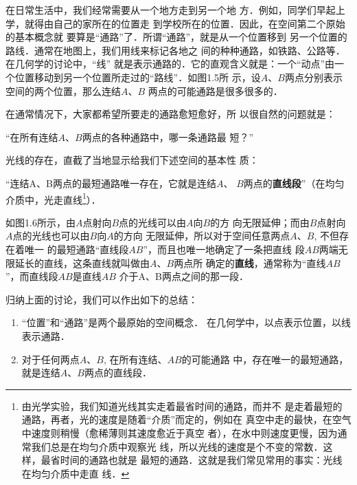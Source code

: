 在日常生活中，我们经常需要从一个地方走到另一个地
方．例如，同学们早起上学，就得由自己的家所在的位置走
到学校所在的位置．因此，在空间第二个原始的基本概念就
要算是“通路”了．所谓“通路”，就是从一个位置移到
另一个位置的路线．通常在地图上，我们用线来标记各地之
间的种种通路，如铁路、公路等．在几何学的讨论中，“线”
就是表示通路的．它的直观含义就是：一个“动点”由一
个位置移动到另一个位置所走过的“路线”．如图1.5所
示，设$A$、$B$两点分别表示空间的两个位置，那么连结$A$、$B$
两点的可能通路是很多很多的．

在通常情况下，大家都希望所要走的通路愈短愈好，所
以很自然的问题就是：

“在所有连结$A$、$B$两点的各种通路中，哪一条通路最
短？”

光线的存在，直截了当地显示给我们下述空间的基本性
质：

“连结A、B两点的最短通路唯一存在，它就是连结$A$、
$B$两点的\textbf{直线段}”（在均匀介质中，光走直线\footnote{由光学实验，我们知道光线其实走着最省时间的通路，而并不
	是走着最短的通路，再者，光的速度是随着“介质”而定的，例如在
	真空中走的最快，在空气中速度则稍慢（愈稀薄则其速度愈近于真空
	者），在水中则速度更慢，因为通常我们总是在均匀介质中观察光
	线，所以光线的速度是个不变的常数．这样，最省时间的通路也就是
	最短的通路．这就是我们常见常用的事实：光线在均匀介质中走直
	线．}）．

\begin{figure}[htp]
	\centering
{}
	\caption{}
\end{figure}


如图1.6所示，由$A$点射向$B$点的光线可以由$A$向$B$的方
向无限延伸；而由$B$点射向$A$点的光线也可以由$B$向$A$的方向
无限延伸，所以对于空间任意两点$A$、$B$, 不但存在着唯一
的最短通路“直线段$AB$”，而且也唯一地确定了一条把直线
段$AB$两端无限延长的直线，这条直线就叫做由$A$、$B$两点所
确定的\textbf{直线}，通常称为“直线$AB$”，而直线段$AB$是直线$AB$
介于A、B两点之间的那一段．

归纳上面的讨论，我们可以作出如下的总结：

\begin{enumerate}
	\item “位置”和“通路”是两个最原始的空间概念．
在几何学中，以点表示位置，以线表示通路．
\item 对于任何两点$A$、$B$, 在所有连结、$AB$的可能通路
中，存在唯一的最短通路，就是连结$A$、$B$两点的直线段．
\end{enumerate}

